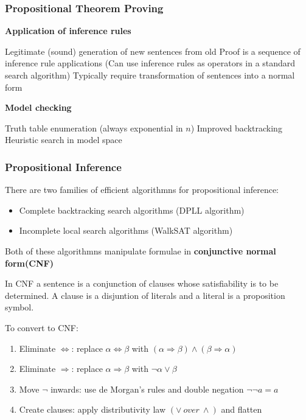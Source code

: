 \documentclass{article}
\begin{document}
\subsubsection{Propositional Theorem Proving}

\textbf{Application of inference rules}

Legitimate (sound) generation of new sentences from old
Proof is a sequence of inference rule applications (Can use inference rules as operators in a standard search algorithm)
Typically require transformation of sentences into a normal form

\textbf{Model checking}

Truth table enumeration (always exponential in $n$)
Improved backtracking
Heuristic search in model space


\subsubsection{Propositional Inference}

There are two families of efficient algorithmns for propositional inference:
\begin{itemize}
    \item Complete backtracking search algorithms (DPLL algorithm)
    \item Incomplete local search algorithms (WalkSAT algorithm)
\end{itemize}

Both of these algorithmns manipulate formulae in \textbf{conjunctive normal form(CNF)}

In CNF a sentence is a conjunction of clauses whose satisfiability is to be determined. A clause is a disjuntion of literals and a literal is a proposition symbol.  \newline

To convert to CNF:
\begin{enumerate}
    \item Eliminate $\Leftrightarrow$: replace $\alpha \Leftrightarrow \beta$ with $(\alpha \Rightarrow \beta)\wedge(\beta \Rightarrow \alpha)$
    \item Eliminate $\Rightarrow$: replace $\alpha \Rightarrow \beta$ with $\neg \alpha \vee \beta$
    \item Move $\neg$ inwards: use de Morgan's rules and double negation $\neg \neg a = a$
    \item Create clauses: apply distributivity law $(\vee \: over \: \wedge)$ and flatten
\end{enumerate}
\end{document}
